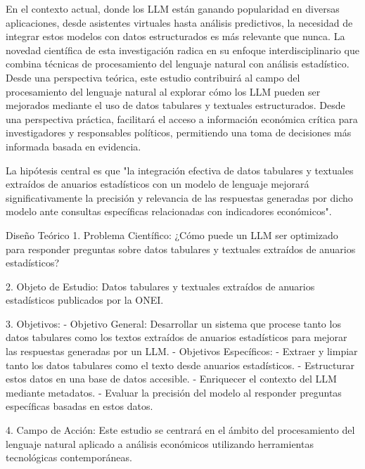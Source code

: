 En el contexto actual, donde los LLM están ganando popularidad en diversas aplicaciones, desde asistentes virtuales hasta análisis predictivos, la necesidad de integrar estos modelos con datos estructurados es más relevante que nunca. La novedad científica de esta investigación radica en su enfoque interdisciplinario que combina técnicas de procesamiento del lenguaje natural con análisis estadístico.
Desde una perspectiva teórica, este estudio contribuirá al campo del procesamiento del lenguaje natural al explorar cómo los LLM pueden ser mejorados mediante el uso de datos tabulares y textuales estructurados. Desde una perspectiva práctica, facilitará el acceso a información económica crítica para investigadores y responsables políticos, permitiendo una toma de decisiones más informada basada en evidencia.

La hipótesis central es que "la integración efectiva de datos tabulares y textuales extraídos de anuarios estadísticos con un modelo de lenguaje mejorará significativamente la precisión y relevancia de las respuestas generadas por dicho modelo ante consultas específicas relacionadas con indicadores económicos".

Diseño Teórico
1. Problema Científico: ¿Cómo puede un LLM ser optimizado para responder preguntas sobre datos tabulares y textuales extraídos de anuarios estadísticos?

2. Objeto de Estudio: Datos tabulares y textuales extraídos de anuarios estadísticos publicados por la ONEI.

3. Objetivos:
   - Objetivo General: Desarrollar un sistema que procese tanto los datos tabulares como los textos extraídos de anuarios estadísticos para mejorar las respuestas generadas por un LLM.
   - Objetivos Específicos:
     - Extraer y limpiar tanto los datos tabulares como el texto desde anuarios estadísticos.
     - Estructurar estos datos en una base de datos accesible.
     - Enriquecer el contexto del LLM mediante metadatos.
     - Evaluar la precisión del modelo al responder preguntas específicas basadas en estos datos.

4. Campo de Acción: Este estudio se centrará en el ámbito del procesamiento del lenguaje natural aplicado a análisis económicos utilizando herramientas tecnológicas contemporáneas.


 




